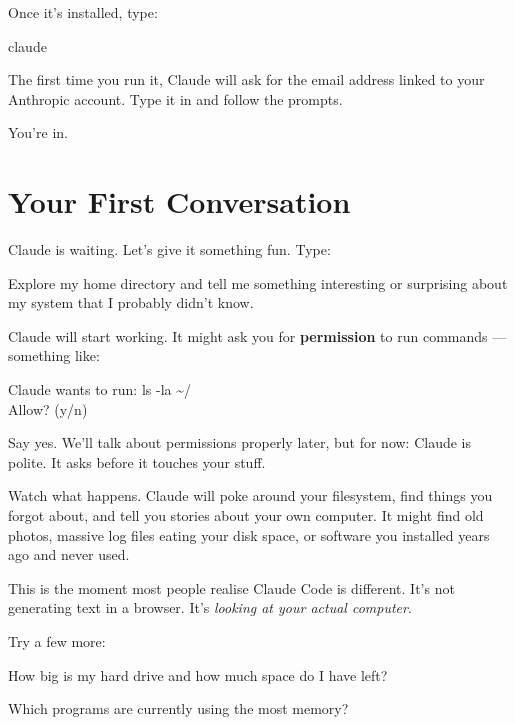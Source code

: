 \documentclass[11pt,a4paper]{article}
\begin{document}
Once it's installed, type:

\begin{tcolorbox}[termbox]
claude
\end{tcolorbox}

The first time you run it, Claude will ask for the email address linked to your Anthropic account. Type it in and follow the prompts.

You're in.

\section{Your First Conversation}

Claude is waiting. Let's give it something fun. Type:

\begin{tcolorbox}[promptbox]
Explore my home directory and tell me something interesting or surprising about my system that I probably didn't know.
\end{tcolorbox}

Claude will start working. It might ask you for \textbf{permission} to run commands --- something like:

\begin{tcolorbox}[termbox]
Claude wants to run: ls -la \textasciitilde/\\
Allow? (y/n)
\end{tcolorbox}

Say yes. We'll talk about permissions properly later, but for now: Claude is polite. It asks before it touches your stuff.

Watch what happens. Claude will poke around your filesystem, find things you forgot about, and tell you stories about your own computer. It might find old photos, massive log files eating your disk space, or software you installed years ago and never used.

This is the moment most people realise Claude Code is different. It's not generating text in a browser. It's \emph{looking at your actual computer}.

Try a few more:

\begin{tcolorbox}[promptbox]
How big is my hard drive and how much space do I have left?
\end{tcolorbox}

\begin{tcolorbox}[promptbox]
Which programs are currently using the most memory?
\end{tcolorbox}
\end{document}
